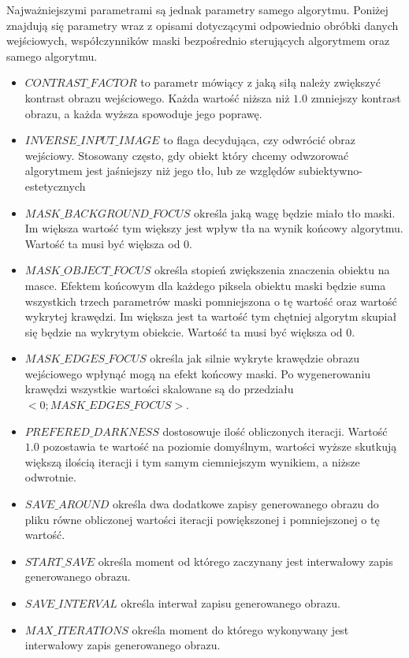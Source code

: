 \documentclass[a4paper, 12pt, polish, twoside]{extreport}
\begin{document}
    Najważniejszymi parametrami są jednak parametry samego algorytmu. Poniżej znajdują się parametry wraz z opisami dotyczącymi odpowiednio obróbki danych wejściowych, współczynników maski bezpośrednio sterujących algorytmem oraz samego algorytmu. 
    \begin{itemize}
        \item \(CONTRAST\_FACTOR\) to parametr mówiący z jaką siłą należy zwiększyć kontrast obrazu wejściowego. Każda wartość niższa niż \(1.0\) zmniejszy kontrast obrazu, a każda wyższa spowoduje jego poprawę.
        \item \(INVERSE\_INPUT\_IMAGE\) to flaga decydująca, czy odwrócić obraz wejściowy. Stosowany często, gdy obiekt który chcemy odwzorować algorytmem jest jaśniejszy niż jego tło, lub ze względów subiektywno-estetycznych 
        \item \(MASK\_BACKGROUND\_FOCUS\) określa jaką wagę będzie miało tło maski. Im większa wartość tym większy jest wpływ tła na wynik końcowy algorytmu. Wartość ta musi być większa od 0.
        \item \(MASK\_OBJECT\_FOCUS\) określa stopień zwiększenia znaczenia obiektu na masce. Efektem końcowym dla każdego piksela obiektu maski będzie suma wszystkich trzech parametrów maski pomniejszona o tę wartość oraz wartość wykrytej krawędzi. Im większa jest ta wartość tym chętniej algorytm skupiał się będzie na wykrytym obiekcie. Wartość ta musi być większa od 0.
        \item \(MASK\_EDGES\_FOCUS\) określa jak silnie wykryte krawędzie obrazu wejściowego wpłynąć mogą na efekt końcowy maski. Po wygenerowaniu krawędzi wszystkie wartości skalowane są do przedziału \(<0;MASK\_EDGES\_FOCUS>\).
        \item \(PREFERED\_DARKNESS\) dostosowuje ilość obliczonych iteracji. Wartość \(1.0\) pozostawia te wartość na poziomie domyślnym, wartości wyższe skutkują większą ilością iteracji i tym samym ciemniejszym wynikiem, a niższe odwrotnie.
        \item \(SAVE\_AROUND\) określa dwa dodatkowe zapisy generowanego obrazu do pliku równe obliczonej wartości iteracji powiększonej i pomniejszonej o tę wartość.
        \item \(START\_SAVE\) określa moment od którego zaczynany jest interwałowy zapis generowanego obrazu.
        \item \(SAVE\_INTERVAL\) określa interwał zapisu generowanego obrazu.
        \item \(MAX\_ITERATIONS\) określa moment do którego wykonywany jest interwałowy zapis generowanego obrazu.

\end{itemize}
\end{document}

